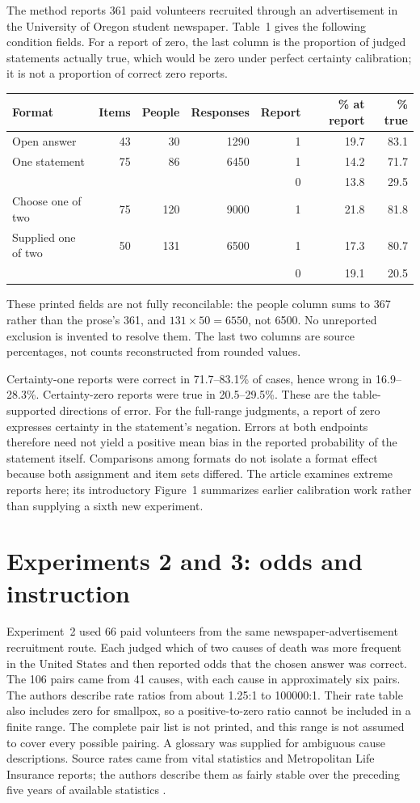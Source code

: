 The method reports 361 paid volunteers recruited through an advertisement
in the University of Oregon student newspaper. Table~1 gives the following
condition fields. For a report of zero, the last column is the proportion
of judged statements actually true, which would be zero under perfect
certainty calibration; it is not a proportion of correct zero reports.
\begin{center}\small
\begin{tabular}{lrrrrrr}
Format&Items&People&Responses&Report&\% at report&\% true\\\hline
Open answer&43&30&1290&1&19.7&83.1\\
One statement&75&86&6450&1&14.2&71.7\\
&&&&0&13.8&29.5\\
Choose one of two&75&120&9000&1&21.8&81.8\\
Supplied one of two&50&131&6500&1&17.3&80.7\\
&&&&0&19.1&20.5
\end{tabular}
\end{center}
These printed fields are not fully reconcilable: the people column sums to
367 rather than the prose's 361, and \(131\times50=6550\), not 6500.
No unreported exclusion is invented to resolve them. The last two columns
are source percentages, not counts reconstructed from rounded values.

Certainty-one reports were correct in 71.7--83.1\% of cases, hence wrong
in 16.9--28.3\%. Certainty-zero reports were true in 20.5--29.5\%.
These are the table-supported directions of error.
For the full-range judgments, a report of zero expresses certainty in the
statement's negation. Errors at both endpoints therefore need not yield a
positive mean bias in the reported probability of the statement itself.
Comparisons among formats
do not isolate a format effect because both assignment and item sets differed.
The article examines extreme reports here; its introductory Figure~1 summarizes
earlier calibration work rather than supplying a sixth new experiment.

\section{Experiments 2 and 3: odds and instruction}
\label{sec:p19-certainty-odds-experiments}

Experiment~2 used 66 paid volunteers from the same newspaper-advertisement
recruitment route. Each judged which of two causes of death was more frequent
in the United States and then reported odds that the chosen answer was
correct. The 106 pairs came from 41 causes, with each cause in approximately
six pairs. The authors describe rate ratios from about 1.25:1 to 100000:1.
Their rate table also includes zero for smallpox, so a positive-to-zero
ratio cannot be included in a finite range. The complete pair list is not
printed, and this range is not assumed to cover every possible pairing.
A glossary
was supplied for ambiguous cause descriptions. Source rates came from vital
statistics and Metropolitan Life Insurance reports; the authors describe them
as fairly stable over the preceding five years of available statistics
\cite[pp.~554--556]{FischhoffSlovicLichtenstein1977Certainty}.

